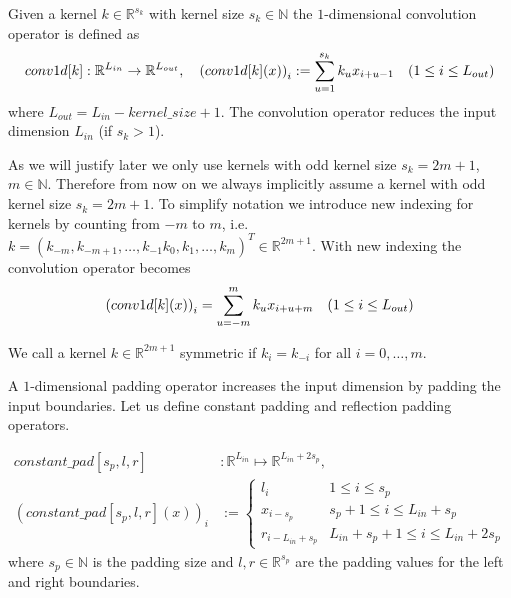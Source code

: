 \documentclass[twoside,a4paper]{article}
\begin{document}

Given a kernel $k \in \mathbb{R}^{s_k}$ with kernel size $s_k \in \mathbb{N}$
the $1$-dimensional convolution operator is defined as
\begin{equation*}
	conv1d[k]: \mathbb{R}^{L_{in}} \to \mathbb{R}^{L_{out}}, \quad
	\left( conv1d[k](x) \right)_i := \sum_{u=1}^{s_k} k_u x_{i+u-1} \quad
	(1 \leq i \leq L_{out})
\end{equation*}
where $L_{out} = L_{in} - kernel\_size + 1$.
The convolution operator reduces the input dimension $L_{in}$ (if $s_k > 1$).


As we will justify later we only use kernels with odd kernel size $s_k = 2m+1$, $m \in \mathbb{N}$.
Therefore from now on we always implicitly assume a kernel with odd kernel size $s_k = 2m+1$.
To simplify notation we introduce new indexing for kernels by counting from $-m$ to $m$,
i.e. $k = (k_{-m}, k_{-m+1}, \dots, k_{-1} k_0, k_1, \dots, k_{m})^T \in \mathbb{R}^{2m+1}$.
With new indexing the convolution operator becomes 
\begin{equation*}
	\left( conv1d[k](x) \right)_i = \sum_{u=-m}^{m} k_u x_{i+u+m} \quad
	(1 \leq i \leq L_{out})
\end{equation*}

We call a kernel $k \in \mathbb{R}^{2m+1}$ symmetric if $k_i = k_{-i}$ for all $i = 0, \dots, m$.

A $1$-dimensional padding operator increases the input dimension by padding
the input boundaries. Let us define constant padding and reflection padding operators.

\begin{align*}
	constant\_pad[s_p,l,r] &: \mathbb{R}^{L_{in}} \mapsto \mathbb{R}^{L_{in}+2s_p}, \\
	(constant\_pad[s_p,l,r](x))_i &:=
	\begin{cases}
		l_i & 1 \leq i \leq s_p \\
		x_{i-s_p} & s_p+1 \leq i \leq L_{in}+s_p \\
		r_{i-L_{in}+s_p} & L_{in}+s_p+1 \leq i \leq L_{in} + 2s_p
	\end{cases}
\end{align*}
where $s_p \in \mathbb{N}$ is the padding size and $l,r \in \mathbb{R}^{s_p}$
are the padding values for the left and right boundaries. 
\end{document}
